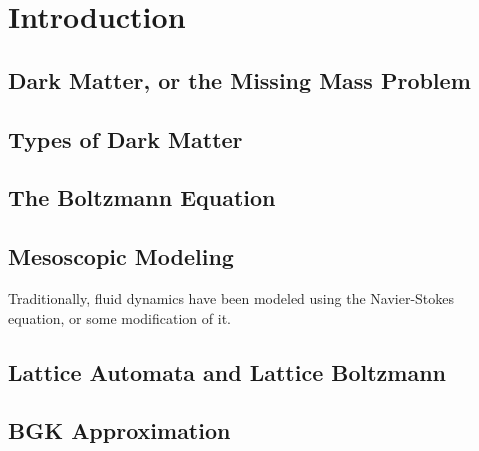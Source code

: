 \chapter{Introduction}
\section{Dark Matter, or the Missing Mass Problem}
\section{Types of Dark Matter}
\section{The Boltzmann Equation}
\section{Mesoscopic Modeling}
Traditionally, fluid dynamics have been modeled using the Navier-Stokes equation, or some modification of it. 
\section{Lattice Automata and Lattice Boltzmann}
\section{BGK Approximation}
